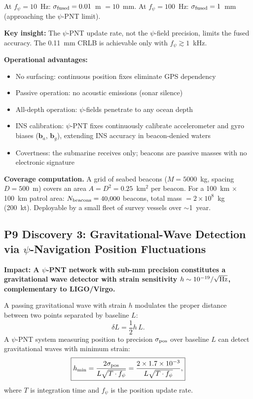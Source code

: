\documentclass[aps,prd,twocolumn,superscriptaddress,nofootinbib]{revtex4-2}
\begin{document}
At $f_\psi = 10$~Hz: $\sigma_{\rm fused} = 0.01$~m $= 10$~mm.
At $f_\psi = 100$~Hz: $\sigma_{\rm fused} = 1$~mm (approaching
the $\psi$-PNT limit).

\textbf{Key insight:} The $\psi$-PNT update rate, not the
$\psi$-field precision, limits the fused accuracy.  The 0.11~mm
CRLB is achievable only with $f_\psi \gtrsim 1$~kHz.

\textbf{Operational advantages:}
\begin{itemize}
\item No surfacing: continuous position fixes eliminate GPS dependency
\item Passive operation: no acoustic emissions (sonar silence)
\item All-depth operation: $\psi$-fields penetrate to any ocean depth
\item INS calibration: $\psi$-PNT fixes continuously calibrate
accelerometer and gyro biases ($\mathbf{b}_a$, $\mathbf{b}_g$),
extending INS accuracy in beacon-denied waters
\item Covertness: the submarine receives only; beacons are passive
masses with no electronic signature
\end{itemize}

\textbf{Coverage computation.}
A grid of seabed beacons ($M = 5000$~kg, spacing $D = 500$~m) covers
an area $A = D^2 = 0.25$~km$^2$ per beacon.  For a 100~km $\times$
100~km patrol area: $N_{\rm beacons} = 40{,}000$ beacons, total mass
$= 2\times10^8$~kg (200~kt).  Deployable by a small fleet of survey
vessels over $\sim$1~year.

\subsection{P9 Discovery 3: Gravitational-Wave Detection via
$\psi$-Navigation Position Fluctuations}

\textbf{Impact: A $\psi$-PNT network with sub-mm precision constitutes
a gravitational wave detector with strain sensitivity
$h \sim 10^{-19}/\sqrt{\rm Hz}$, complementary to LIGO/Virgo.}

A passing gravitational wave with strain $h$ modulates the proper
distance between two points separated by baseline $L$:
\begin{equation}
\delta L = \frac{1}{2}h\,L.
\label{eq:gw-strain}
\end{equation}
A $\psi$-PNT system measuring position to precision
$\sigma_{\rm pos}$ over baseline $L$ can detect gravitational waves
with minimum strain:
\begin{equation}
\boxed{
h_{\rm min} = \frac{2\sigma_{\rm pos}}{L\sqrt{T\cdot f_\psi}}
= \frac{2\times 1.7\times10^{-3}}{L\sqrt{T\cdot f_\psi}},
}
\label{eq:gw-sensitivity}
\end{equation}
where $T$ is integration time and $f_\psi$ is the position update rate.
\end{document}
